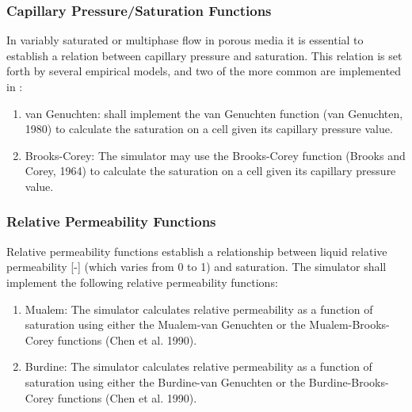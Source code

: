 \subsubsection{Capillary Pressure/Saturation Functions}
In variably saturated or multiphase flow in porous media it is essential to establish a relation between capillary pressure and saturation. This relation is set forth by several empirical models, and two of the more common are implemented in \pft:
\begin{enumerate}[resume]
	\item van Genuchten: \label{vanGen} \pft shall implement the van Genuchten function (van Genuchten, 1980) to calculate the saturation on a cell given its capillary pressure value.
	\item Brooks-Corey: \label{brCorey} The simulator may use the Brooks-Corey function (Brooks and Corey,  1964) to calculate the saturation on a cell given its capillary pressure value.
\end{enumerate}

\subsubsection{Relative Permeability Functions}

Relative permeability functions establish a relationship between liquid relative permeability [-] (which varies from 0 to 1) and saturation. The simulator shall implement the following relative permeability functions: 

\begin{enumerate}[resume]
	\item Mualem: \label{mualem} The simulator calculates relative permeability as a function of saturation using either the Mualem-van Genuchten or the Mualem-Brooks-Corey functions (Chen et al. 1990). 
	\item Burdine: \label{burdine} The simulator calculates relative permeability as a function of saturation using either the Burdine-van Genuchten or the Burdine-Brooks-Corey functions (Chen et al. 1990). 
\end{enumerate}

